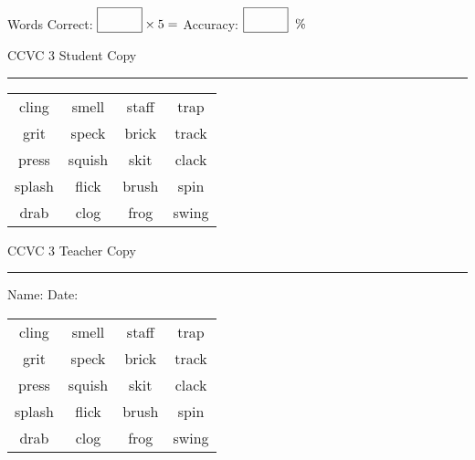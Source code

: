 \documentclass{memoir}
\begin{document}
\small

Words Correct: $\fbox{\phantom{\huge 100}} \times 5 = $ Accuracy: $\fbox{\phantom{\huge 100}}\;\; \%$ 

\vfill

\newpage


\footnotesize \noindent
CCVC 3 \hfill Student Copy
\smallskip
\hrule

\Large

\setlength{\tabcolsep}{14pt}
\def\arraystretch{3}

{\selectfont


\begin{vplace}[0.5]
\begin{center}
\begin{tabular}{cccc}
cling & smell & staff            & trap \\
grit      & speck & brick       & track       \\
press       & squish & skit & clack             \\
splash & flick            & brush & spin \\
drab             & clog & frog & swing \\
\end{tabular}
\end{center}
\end{vplace}

}

\newpage

\footnotesize \noindent
CCVC 3 \hfill Teacher Copy
\smallskip
\hrule

\small

\vfill

\noindent
Name: \underline{\hspace{1.75in}} \hfill Date: \underline{\hspace{1in}}

\Large

{\selectfont


\begin{vplace}[0.5]
\begin{center}
\begin{tabular}{cccc}
cling & smell & staff            & trap \\
grit      & speck & brick       & track       \\
press       & squish & skit & clack             \\
splash & flick            & brush & spin \\
drab             & clog & frog & swing \\
\end{tabular}
\end{center}
\end{vplace}



}
\end{document}
